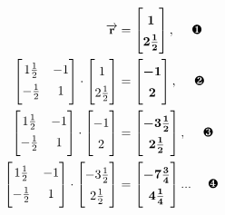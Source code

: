 \vspace{-.2in}
\begin{align*}
\renewcommand*{\arraystretch}{1.4}
\small
\overrightarrow{\textbf{r}} &=
\boldmath
\begin{bmatrix}
1 \\ 2\frac{1}{2} \\
\end{bmatrix}, \quad \textrm{ \ding{182}} \\
\unboldmath
\begin{bmatrix}
1\frac{1}{2} & -1 \\
\smallskip
-\frac{1}{2} & 1 \\
\end{bmatrix} \cdot
\begin{bmatrix}
1 \\ 2\frac{1}{2} \\
\end{bmatrix} &=
\boldmath
\begin{bmatrix}
-1 \\ 2 \\
\end{bmatrix}, \quad \textrm{ \ding{183}} \\
\unboldmath
\begin{bmatrix}
1\frac{1}{2} & -1 \\
\smallskip
-\frac{1}{2} & 1 \\
\end{bmatrix} \cdot
\begin{bmatrix}
-1 \\ 2 \\
\end{bmatrix} &=
\boldmath
\begin{bmatrix}
-3\frac{1}{2} \\ 2\frac{1}{2} \\
\end{bmatrix}, \quad \textrm{ \ding{184}} \\
\unboldmath
\begin{bmatrix}
1\frac{1}{2} & -1 \\
\smallskip
-\frac{1}{2} & 1 \\
\end{bmatrix} \cdot
\begin{bmatrix}
-3\frac{1}{2} \\ 2\frac{1}{2} \\
\end{bmatrix} &=
\boldmath
\begin{bmatrix}
-7\frac{3}{4} \\ 4\frac{1}{4} \\
\end{bmatrix}... \quad \textrm{ \ding{185}} \\
\unboldmath
\end{align*}

